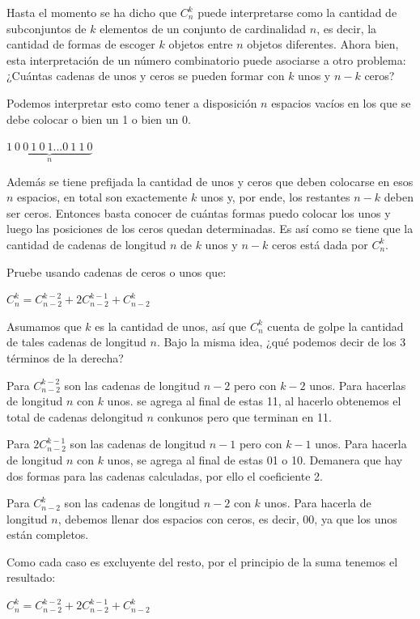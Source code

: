 \documentclass[12pt]{article}
\begin{document}
Hasta el momento se ha dicho que $C^{k}_{n}$ puede interpretarse como la cantidad de subconjuntos de $k$ elementos de un conjunto de cardinalidad $n$, es decir, la cantidad de formas de escoger $k$ objetos entre $n$ objetos diferentes. Ahora bien, esta interpretación de un número combinatorio puede asociarse a otro problema:¿Cuántas cadenas de unos y ceros se pueden formar con $k$ unos y $n-k$ ceros?

Podemos interpretar esto como tener a disposición $n$ espacios vacíos en los que se debe colocar o bien un 1 o bien un 0.

\begin{center}
    $\underbrace{1\ 0\ 0\ 1\ 0\ 1...0\ 1\ 1\ 0}_{n}$
\end{center}

Además se tiene prefijada la cantidad de unos y ceros que deben colocarse en esos $n$ espacios, en total son exactemente $k$ unos y, por ende, los restantes $n-k$ deben ser ceros.  Entonces basta conocer de cuántas formas puedo colocar los unos y luego las posiciones de los ceros quedan determinadas. Es así como se tiene que
la cantidad de cadenas de longitud $n$ de $k$ unos y $n-k$ ceros está dada por $C^{k}_{n}$.

\begin{ejemplo}
    Pruebe usando cadenas de ceros o unos que:
    \begin{center}
        $C^{k}_{n}=C^{k-2}_{n-2}+2C^{k-1}_{n-2}+C^{k}_{n-2}$
    \end{center}
\end{ejemplo}

\begin{solucion}
    Asumamos que $k$ es la cantidad de unos, así que $C^{k}_{n}$ cuenta de golpe la cantidad de tales cadenas de longitud $n$. Bajo la misma idea, ¿qué podemos decir de los 3 términos de la derecha?

    Para $C^{k-2}_{n-2}$ son las cadenas de longitud $n-2$ pero con $k-2$ unos. Para hacerlas de longitud $n$ con $k$ unos. se agrega al final de estas 11, al hacerlo obtenemos el total de cadenas delongitud $n$ conkunos pero que terminan en 11.

    Para $2C^{k-1}_{n-2}$ son las cadenas de longitud $n-1$ pero con $k-1$ unos. Para hacerla de longitud $n$ con $k$ unos, se agrega al final de estas 01 o 10.  Demanera que hay dos formas para las cadenas calculadas, por ello el coeficiente 2.

    Para $C^{k}_{n-2}$ son las cadenas de longitud $n-2$ con $k$ unos. Para hacerla de longitud $n$, debemos llenar dos espacios con ceros, es decir, 00, ya que los unos están completos.

    Como cada caso es excluyente del resto, por el principio de la suma tenemos el resultado:

    \begin{center}
        $C^{k}_{n}=C^{k-2}_{n-2}+2C^{k-1}_{n-2}+C^{k}_{n-2}$
    \end{center}
\end{solucion}
\end{document}
